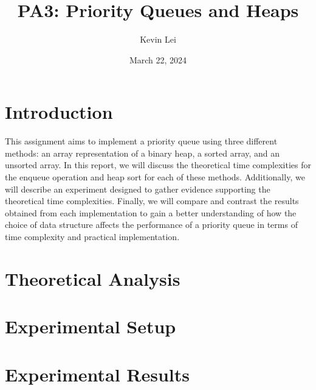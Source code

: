 \documentclass{article}
\title{PA3: Priority Queues and Heaps}
\author{Kevin Lei}
\date{March 22, 2024}
\begin{document}
\maketitle

\section{Introduction}
This assignment aims to implement a priority queue using three different methods: an array representation of a binary heap, a sorted array, and an unsorted array. 
In this report, we will discuss the theoretical time complexities for the enqueue operation and heap sort for each of these methods. 
Additionally, we will describe an experiment designed to gather evidence supporting the theoretical time complexities. 
Finally, we will compare and contrast the results obtained from each implementation to gain a better understanding of how the choice of data structure affects the performance of a priority queue in terms of time complexity and practical implementation.
\section{Theoretical Analysis}


\section{Experimental Setup}


\section{Experimental Results}
\end{document}
